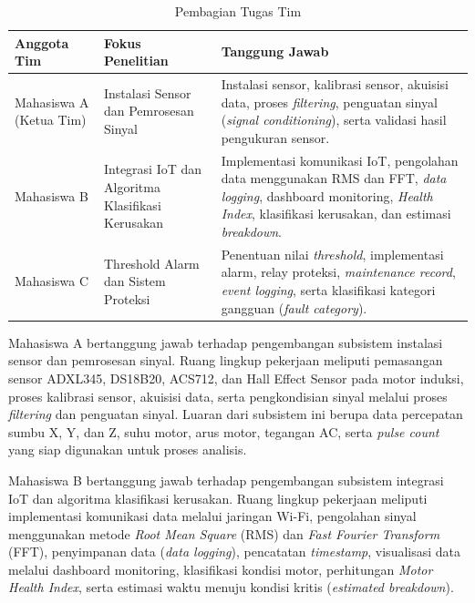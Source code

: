 \documentclass{elsinta}
\begin{document}
\begin{table}[H]
\centering
\caption{Pembagian Tugas Tim}
\label{tab:pembagian_tugas}


\begin{tabular}{|p{3cm}|p{4cm}|p{7cm}|}
\hline
\centering\textbf{Anggota Tim} &
\centering\textbf{Fokus Penelitian} &
\centering\arraybackslash\textbf{Tanggung Jawab}
\\
\hline

Mahasiswa A (Ketua Tim)
&
Instalasi Sensor dan Pemrosesan Sinyal
&
Instalasi sensor, kalibrasi sensor, akuisisi data, proses \textit{filtering}, penguatan sinyal (\textit{signal conditioning}), serta validasi hasil pengukuran sensor.
\\
\hline

Mahasiswa B
&
Integrasi IoT dan Algoritma Klasifikasi Kerusakan
&
Implementasi komunikasi IoT, pengolahan data menggunakan RMS dan FFT, \textit{data logging}, dashboard monitoring, \textit{Health Index}, klasifikasi kerusakan, dan estimasi \textit{breakdown}.
\\
\hline

Mahasiswa C
&
Threshold Alarm dan Sistem Proteksi
&
Penentuan nilai \textit{threshold}, implementasi alarm, relay proteksi, \textit{maintenance record}, \textit{event logging}, serta klasifikasi kategori gangguan (\textit{fault category}).
\\
\hline

\end{tabular}
\end{table}

Mahasiswa A bertanggung jawab terhadap pengembangan subsistem instalasi sensor dan pemrosesan sinyal. Ruang lingkup pekerjaan meliputi pemasangan sensor ADXL345, DS18B20, ACS712, dan Hall Effect Sensor pada motor induksi, proses kalibrasi sensor, akuisisi data, serta pengkondisian sinyal melalui proses \textit{filtering} dan penguatan sinyal. Luaran dari subsistem ini berupa data percepatan sumbu X, Y, dan Z, suhu motor, arus motor, tegangan AC, serta \textit{pulse count} yang siap digunakan untuk proses analisis.

Mahasiswa B bertanggung jawab terhadap pengembangan subsistem integrasi IoT dan algoritma klasifikasi kerusakan. Ruang lingkup pekerjaan meliputi implementasi komunikasi data melalui jaringan Wi-Fi, pengolahan sinyal menggunakan metode \textit{Root Mean Square} (RMS) dan \textit{Fast Fourier Transform} (FFT), penyimpanan data (\textit{data logging}), pencatatan \textit{timestamp}, visualisasi data melalui dashboard monitoring, klasifikasi kondisi motor, perhitungan \textit{Motor Health Index}, serta estimasi waktu menuju kondisi kritis (\textit{estimated breakdown}).
\end{document}
